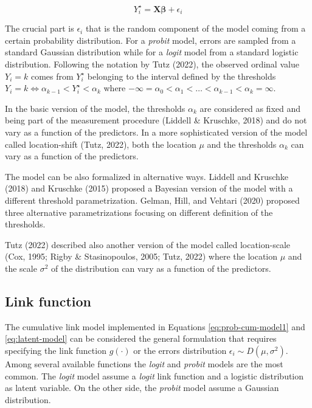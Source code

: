 \documentclass[
  man,floatsintext]{apa6}
\begin{document}
\begin{equation} 
Y^\star_i = \mathbf{X}\boldsymbol{\beta} + \epsilon_i
\label{eq:latent-model}
\end{equation}

The crucial part is \(\epsilon_i\) that is the random component of the model coming from a certain probability distribution. For a \emph{probit} model, errors are sampled from a standard Gaussian distribution while for a \emph{logit} model from a standard logistic distribution. Following the notation by Tutz (2022), the observed ordinal value \(Y_i = k\) comes from \(Y^\star_i\) belonging to the interval defined by the thresholds \(Y_i = k \iff \alpha_{k - 1} < Y^\star_i < \alpha_{k}\) where \(- \infty = \alpha_0 < \alpha_1 < \dots< \alpha_{k - 1} < \alpha_k = \infty\).

In the basic version of the model, the thresholds \(\alpha_k\) are considered as fixed and being part of the measurement procedure (Liddell \& Kruschke, 2018) and do not vary as a function of the predictors. In a more sophisticated version of the model called location-shift (Tutz, 2022), both the location \(\mu\) and the thresholds \(\alpha_k\) can vary as a function of the predictors.

The model can be also formalized in alternative ways. Liddell and Kruschke (2018) and Kruschke (2015) proposed a Bayesian version of the model with a different threshold parametrization. Gelman, Hill, and Vehtari (2020) proposed three alternative parametrizations focusing on different definition of the thresholds.

Tutz (2022) described also another version of the model called location-scale (Cox, 1995; Rigby \& Stasinopoulos, 2005; Tutz, 2022) where the location \(\mu\) and the scale \(\sigma^2\) of the distribution can vary as a function of the predictors.

\subsection{Link function}\label{link-function}

The cumulative link model implemented in Equations \eqref{eq:prob-cum-model1} and \eqref{eq:latent-model} can be considered the general formulation that requires specifying the link function \(g(\cdot)\) or the errors distribution \(\epsilon_i \sim D(\mu, \sigma^2)\). Among several available functions the \emph{logit} and \emph{probit} models are the most common. The \emph{logit} model assume a \emph{logit} link function and a logistic distribution as latent variable. On the other side, the \emph{probit} model assume a Gaussian distribution.
\end{document}
